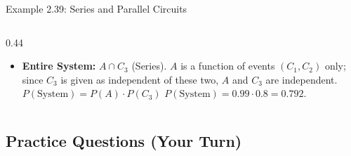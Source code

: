 \documentclass[light]{lutbeamer}
\begin{document}
\begin{frame}{Example 2.39: Series and Parallel Circuits}
\begin{columns}[T]
\begin{column}{0.44\textwidth}
{\begin{itemize}
                    \item \textbf{Entire System:} $A \cap C_3$ (Series).
                    $A$ is a function of events $(C_1,C_2)$ only; since $C_3$ is given as independent of these two, $A$ and $C_3$ are independent.
                    $P(\text{System}) = P(A) \cdot P(C_3)$
                    $P(\text{System}) = 0.99 \cdot 0.8 = 0.792$.
                \end{itemize}
            }
        \end{column}
    \end{columns}
\end{frame}

\subsection{Practice Questions (Your Turn)}
\end{document}
